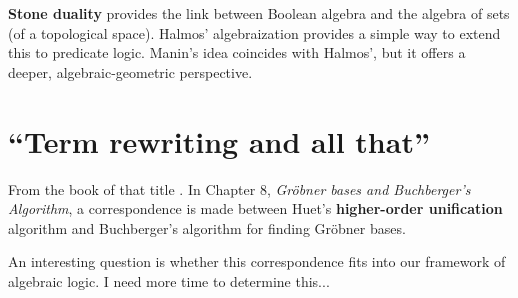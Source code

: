 

\textbf{Stone duality} provides the link between Boolean algebra and the algebra of sets (of a topological space).  Halmos' algebraization provides a simple way to extend this to predicate logic.  Manin's idea coincides with Halmos', but it offers a deeper, algebraic-geometric perspective.

\begin{figure}
\end{figure}

\begin{figure}
\end{figure}

\begin{figure}
\end{figure}

\begin{figure}
\end{figure}

\section{``Term rewriting and all that''}

From the book of that title \cite{Baader1998}.  In Chapter 8, \textit{Gr\"{o}bner bases and Buchberger's Algorithm}, a correspondence is made between Huet's \textbf{higher-order unification} algorithm and Buchberger's algorithm for finding Gr\"{o}bner bases.

An interesting question is whether this correspondence fits into our framework of algebraic logic.  I need more time to determine this...

